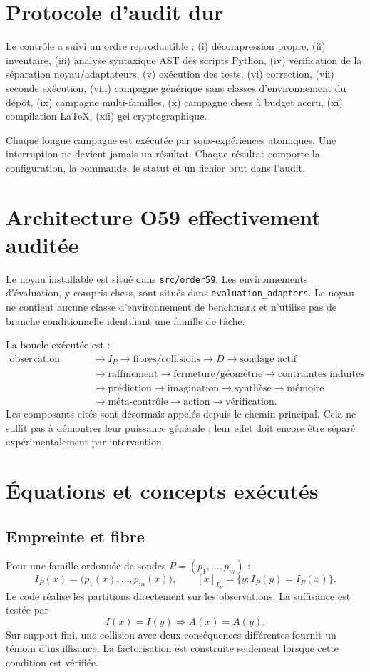 \documentclass[11pt,a4paper]{article}
\begin{document}
\section{Protocole d'audit dur}
Le contrôle a suivi un ordre reproductible : (i) décompression propre, (ii) inventaire, (iii) analyse syntaxique AST des scripts Python, (iv) vérification de la séparation noyau/adaptateurs, (v) exécution des tests, (vi) correction, (vii) seconde exécution, (viii) campagne générique sans classes d'environnement du dépôt, (ix) campagne multi-familles, (x) campagne chess à budget accru, (xi) compilation LaTeX, (xii) gel cryptographique.

Chaque longue campagne est exécutée par sous-expériences atomiques. Une interruption ne devient jamais un résultat. Chaque résultat comporte la configuration, la commande, le statut et un fichier brut dans l'audit.

\section{Architecture O59 effectivement auditée}
Le noyau installable est situé dans \texttt{src/order59}. Les environnements d'évaluation, y compris chess, sont situés dans \texttt{evaluation\_adapters}. Le noyau ne contient aucune classe d'environnement de benchmark et n'utilise pas de branche conditionnelle identifiant une famille de tâche.

La boucle exécutée est :
\begin{align*}
\text{observation brute}&\to I_P\to \text{fibres/collisions}\to D\to \text{sondage actif}\\
&\to \text{raffinement}\to \text{fermeture/géométrie}\to \text{contraintes induites}\\
&\to \text{prédiction}\to \text{imagination}\to \text{synthèse}\to \text{mémoire}\\
&\to \text{méta-contrôle}\to \text{action}\to \text{vérification}.
\end{align*}
Les composants cités sont désormais appelés depuis le chemin principal. Cela ne suffit pas à démontrer leur puissance générale ; leur effet doit encore être séparé expérimentalement par intervention.

\section{Équations et concepts exécutés}
\subsection{Empreinte et fibre}
Pour une famille ordonnée de sondes $P=(p_1,\ldots,p_m)$ :
\[
I_P(x)=\bigl(p_1(x),\ldots,p_m(x)\bigr),
\qquad
[x]_{I_P}=\{y:I_P(y)=I_P(x)\}.
\]
Le code réalise les partitions directement sur les observations. La suffisance est testée par
\[
I(x)=I(y)\Longrightarrow A(x)=A(y).
\]
Sur support fini, une collision avec deux conséquences différentes fournit un témoin d'insuffisance. La factorisation est construite seulement lorsque cette condition est vérifiée.
\end{document}
